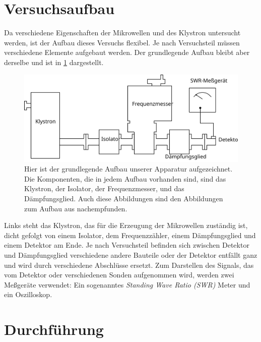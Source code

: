 
\section{Versuchsaufbau}

Da verschiedene Eigenschaften der Mikrowellen und des Klystron
untersucht werden, ist der Aufbau dieses Versuchs flexibel.  Je nach
Versuchsteil müssen verschiedene Elemente aufgebaut werden.  Der
grundlegende Aufbau bleibt aber derselbe und ist in
\cref{fig:grundaufbau} dargestellt.

\begin{figure}
  \centering
  \includegraphics{abbildungen/grundaufbau}
  \caption{Hier ist der grundlegende Aufbau unserer Apparatur
    aufgezeichnet.  Die Komponenten, die in jedem Aufbau vorhanden sind,
    sind das Klystron, der Isolator, der Frequenzmesser, und das
    Dämpfungsglied. Auch diese Abbildungen sind den Abbildungen zum
    Aufbau aus \cite{v053} nachempfunden.}
  \label{fig:grundaufbau}
\end{figure}

Links steht das Klystron, das für die Erzeugung der Mikrowellen
zuständig ist, dicht gefolgt von einem Isolator, dem Frequenzzähler,
einem Dämpfungsglied und einem Detektor am Ende. Je nach Versuchsteil
befinden sich zwischen Detektor und Dämpfungsglied verschiedene andere
Bauteile oder der Detektor entfällt ganz und wird durch verschiedene
Abschlüsse ersetzt.  Zum Darstellen des Signals, das vom Detektor oder
verschiedenen Sonden aufgenommen wird, werden zwei Meßgeräte verwendet:
Ein sogenanntes \emph{Standing Wave Ratio (SWR)} Meter und ein
Oszilloskop.

\section{Durchführung}

